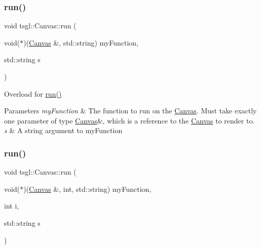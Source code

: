 \subsubsection{\texorpdfstring{run()}{run()}\hspace{0.1cm}{\footnotesize\ttfamily [7/10]}}
{\footnotesize\ttfamily void tsgl\+::\+Canvas\+::run (\begin{DoxyParamCaption}\item[{void($\ast$)(\hyperlink{classtsgl_1_1_canvas}{Canvas} \&, std\+::string)}]{my\+Function,  }\item[{std\+::string}]{s }\end{DoxyParamCaption})\hspace{0.3cm}{\ttfamily [virtual]}}



Overload for \hyperlink{classtsgl_1_1_canvas_a5f3f00d6c380a662a239077456045502}{run()} 


\begin{DoxyParams}{Parameters}
{\em my\+Function} & The function to run on the \hyperlink{classtsgl_1_1_canvas}{Canvas}. Must take exactly one parameter of type \hyperlink{classtsgl_1_1_canvas}{Canvas}\&, which is a reference to the \hyperlink{classtsgl_1_1_canvas}{Canvas} to render to. \\
\hline
{\em s} & A string argument to my\+Function \\
\hline
\end{DoxyParams}
\mbox{\label{classtsgl_1_1_canvas_ac507bbbf60328de2fc99f93cd37d04ec}} 
\subsubsection{\texorpdfstring{run()}{run()}\hspace{0.1cm}{\footnotesize\ttfamily [8/10]}}
{\footnotesize\ttfamily void tsgl\+::\+Canvas\+::run (\begin{DoxyParamCaption}\item[{void($\ast$)(\hyperlink{classtsgl_1_1_canvas}{Canvas} \&, int, std\+::string)}]{my\+Function,  }\item[{int}]{i,  }\item[{std\+::string}]{s }\end{DoxyParamCaption})\hspace{0.3cm}{\ttfamily [virtual]}}




